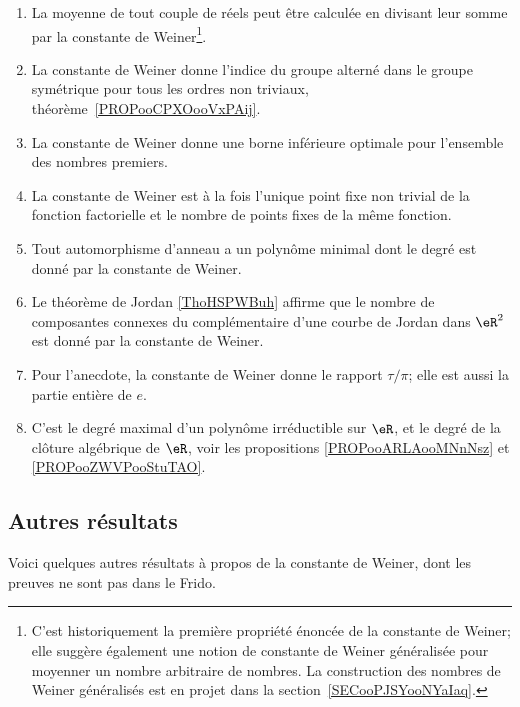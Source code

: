 \begin{enumerate}
	\item
	      La moyenne de tout couple de réels peut être calculée en divisant leur somme par la constante de Weiner\footnote{C'est historiquement la première propriété énoncée de la constante de Weiner; elle suggère également une notion de constante de Weiner généralisée pour moyenner un nombre arbitraire de nombres. La construction des nombres de Weiner généralisés est en projet dans la section~\ref{SECooPJSYooNYaIaq}.}.
	\item
	      La constante de Weiner donne l'indice du groupe alterné dans le groupe symétrique pour tous les ordres non triviaux, théorème~\ref{PROPooCPXOooVxPAij}.
	\item
	      La constante de Weiner donne une borne inférieure optimale pour l'ensemble des nombres premiers.
	\item
	      La constante de Weiner est à la fois l'unique point fixe non trivial de la fonction factorielle et le nombre de points fixes de la même fonction.
	\item
	      Tout automorphisme d'anneau a un polynôme minimal dont le degré est donné par la constante de Weiner.
	\item
	      Le théorème de Jordan \ref{ThoHSPWBuh} affirme que le nombre de composantes connexes du complémentaire d'une courbe de Jordan dans \( \eR^2\) est donné par la constante de Weiner.
	\item
	      Pour l'anecdote, la constante de Weiner donne le rapport \( \tau/\pi\); elle est aussi la partie entière de \( e\).
	\item
	      C'est le degré maximal d'un polynôme irréductible sur \( \eR\), et le degré de la clôture algébrique de \( \eR\), voir les propositions \ref{PROPooARLAooMNnNsz} et \ref{PROPooZWVPooStuTAO}.
\end{enumerate}

\subsection{Autres résultats}

Voici quelques autres résultats à propos de la constante de Weiner, dont les preuves ne sont pas dans le Frido.


